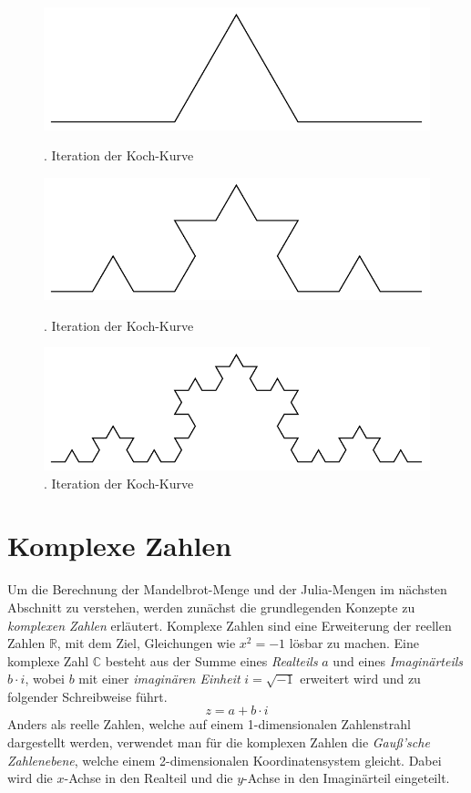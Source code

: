 \begin{figure}[!htb]
  \includegraphics[width=\linewidth]{img/Koch-Kurve-1.pdf}
  \caption{. Iteration der Koch-Kurve}\label{fig:koch_kurve_1}
  \endminipage\hfill
  \includegraphics[width=\linewidth]{img/Koch-Kurve-2.pdf}
  \caption{. Iteration der Koch-Kurve}\label{fig:koch_kurve_2}
  \endminipage\hfill
  \includegraphics[width=\linewidth]{img/Koch-Kurve-3.pdf}
  \caption{. Iteration der Koch-Kurve}\label{fig:koch_kurve_3}
  \endminipage
\end{figure}

\section{Komplexe Zahlen}

Um die Berechnung der Mandelbrot-Menge und der Julia-Mengen im nächsten
Abschnitt zu verstehen, werden zunächst die grundlegenden Konzepte zu
\textit{komplexen Zahlen} erläutert. \newline{} Komplexe Zahlen sind eine
Erweiterung der reellen Zahlen $\mathbb{R}$, mit dem Ziel, Gleichungen wie
$x^{2}=-1$ lösbar zu machen. \newline{} Eine komplexe Zahl $\mathbb{C}$ besteht
aus der Summe eines \textit{Realteils} $a$ und eines \textit{Imaginärteils} $b
  \cdot i$, wobei $b$ mit einer \textit{imaginären Einheit} $i = \sqrt{-1}$
erweitert wird und zu folgender Schreibweise führt. $$z = a + b \cdot i$$
Anders als reelle Zahlen, welche auf einem 1-dimensionalen Zahlenstrahl
dargestellt werden, verwendet man für die komplexen Zahlen die
\textit{Gauß'sche Zahlenebene}, welche einem 2-dimensionalen Koordinatensystem
gleicht. Dabei wird die $x$-Achse in den Realteil und die $y$-Achse in den
Imaginärteil eingeteilt.

